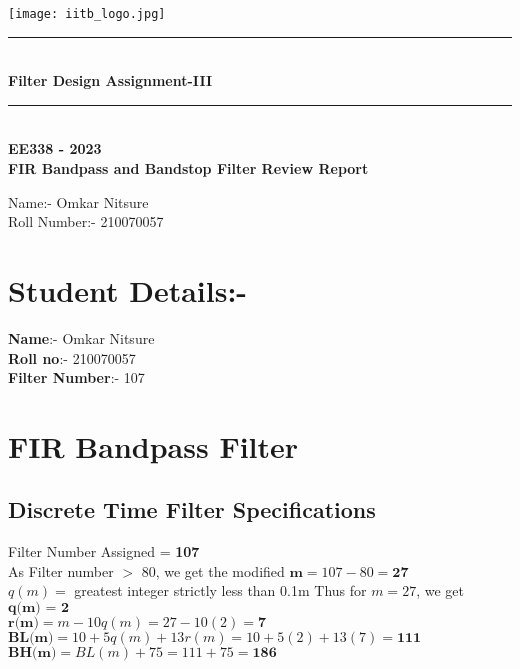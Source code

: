 \documentclass[12pt]{article}
\begin{document}
\begin{titlepage}
\begin{center}
    \vspace*{\fill}
\texttt{[image: iitb\_logo.jpg]}\\
[4 cm]
    \rule{12.5cm}{0.75mm}\\
    \huge{\bfseries Filter Design Assignment-III}
    \rule{12.5cm}{0.75mm}\\
    [0.5cm]
   {\textbf {EE338 - 2023 \\
    FIR Bandpass and Bandstop Filter Review Report}}\\
    [2cm]
\end{center}
\begin{flushleft}
   {\huge
    Name:- Omkar Nitsure \\
    Roll Number:- 210070057 \\}
    \end{flushleft}
\end{titlepage}
\tableofcontents

\pagestyle{fancy}

\fancyhead{}
\fancyfoot{}
\fancyfoot[C]{\thepage}
\newpage
\section{Student Details:-}
\textbf{Name}:- Omkar Nitsure\\
\textbf{Roll no}:- 210070057\\
\textbf{Filter Number}:- 107\\

\section{FIR Bandpass Filter}
\subsection{Discrete Time Filter Specifications}

Filter Number Assigned = \textbf{107}\\
As Filter number $>$ 80, we get the modified $\textbf{m} = 107 - 80 = \textbf{27}$\\
$q(m) =$ greatest integer strictly less than 0.1m
Thus for $m = 27$, we get $\textbf{q(m) = 2}$\\
$\textbf{r(m)} = m - 10q(m) = 27 - 10(2) = \textbf{7}$\\
$\textbf{BL(m)} = 10 + 5q(m) + 13r(m) = 10 + 5(2) + 13(7) = \textbf{111}$\\
$\textbf{BH(m)} = BL(m) + 75 = 111 + 75 = \textbf{186}$\\
\par
\end{document}
